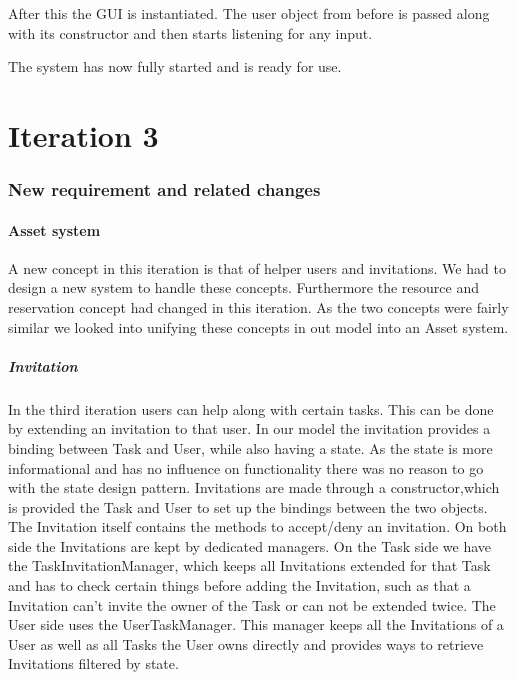 	After this the GUI is instantiated. The user object from before is passed along with its constructor and then starts listening for any input. 
	
	The system has now fully started and is ready for use.	
	
	\newpage
	\part{Iteration 3}
	
		\section{New requirement and related changes}
		\subsection{Asset system}
			A new concept in this iteration is that of helper users and invitations. We had to design a new system to handle these concepts. Furthermore the resource and reservation concept had changed in this iteration. As the two concepts were fairly similar we looked into unifying these concepts in out model into an Asset system.
			\subsubsection{Invitation}
				In the third iteration users can help along with certain tasks. This can be done by extending an invitation to that user. In our model the invitation provides a binding between Task and User, while also having a state. As the state is more informational and has no influence on functionality there was no reason to go with the state design pattern. 
				Invitations are made through a constructor,which is provided the Task and User to set up the bindings between the two objects. The Invitation itself contains the methods to accept/deny an invitation. On both side the Invitations are kept by dedicated managers. On the Task side we have the TaskInvitationManager, which keeps all Invitations extended for that Task and has to check certain things before adding the Invitation, such as that a Invitation can't invite the owner of the Task or can not be extended twice. The User side uses the UserTaskManager. This manager keeps all the Invitations of a User as well as all Tasks the User owns directly and provides ways to retrieve Invitations filtered by state.
				
